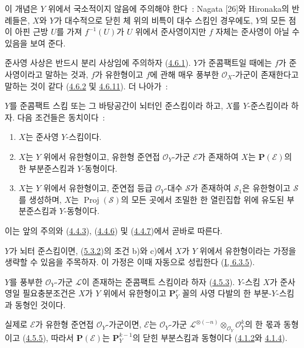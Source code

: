 이 개념은 $Y$ 위에서 국소적이지 않음에 주의해야 한다~: Nagata [26]와
Hironaka의 반례들은, $X$와 $Y$가 대수적으로 닫힌 체 위의 비특이 대수
스킴인 경우에도, $Y$의 모든 점이 아핀 근방 $U$를 가져
$f^{-1}(U)$가 $U$ 위에서 준사영이지만 $f$ 자체는 준사영이 아닐 수
있음을 보여 준다.

준사영 사상은 반드시 분리 사상임에 주의하자
(\hyperref[II.4.6.1-ko]{4.6.1}). $Y$가 준콤팩트일 때에는 $f$가
준사영이라고 말하는 것과, $f$가 유한형이고 $f$에 관해 매우 풍부한
$\mathcal{O}_X$-가군이 존재한다고 말하는 것이 같다
(\hyperref[II.4.6.2-ko]{4.6.2} 및
\hyperref[II.4.6.11-ko]{4.6.11}). 더 나아가~:

\begin{proposition}[5.3.2]
\label{II.5.3.2-ko}
$Y$를 준콤팩트 스킴 또는 그 바탕공간이 뇌터인 준스킴이라 하고,
$X$를 $Y$-준스킴이라 하자. 다음 조건들은 동치이다~:
\begin{enumerate}
  \item[\rm{a)}] $X$는 준사영 $Y$-스킴이다.
  \item[\rm{b)}] $X$는 $Y$ 위에서 유한형이고, 유한형 준연접
  $\mathcal{O}_Y$-가군 $\mathcal{E}$가 존재하여 $X$는
  $\mathbf{P}(\mathcal{E})$의 한 부분준스킴과 $Y$-동형이다.
  \item[\rm{c)}] $X$는 $Y$ 위에서 유한형이고, 준연접 등급
  $\mathcal{O}_Y$-대수 $\mathcal{S}$가 존재하여 $\mathcal{S}_1$은
  유한형이고 $\mathcal{S}$를 생성하며, $X$는
  $\operatorname{Proj}(\mathcal{S})$의 모든 곳에서 조밀한 한 열린집합
  위에 유도된 부분준스킴과 $Y$-동형이다.
\end{enumerate}
\end{proposition}

이는 앞의 주의와 (\hyperref[II.4.4.3-ko]{4.4.3}),
(\hyperref[II.4.4.6-ko]{4.4.6}) 및
(\hyperref[II.4.4.7-ko]{4.4.7})에서 곧바로 따른다.

$Y$가 뇌터 준스킴이면, (\hyperref[II.5.3.2-ko]{5.3.2})의 조건 b)와
c)에서 $X$가 $Y$ 위에서 유한형이라는 가정을 생략할 수 있음을
주목하자. 이 가정은 이때 자동으로 성립한다
(\hyperref[I.6.3.5-ko]{I, 6.3.5}).

\begin{corollary}[5.3.3]
\label{II.5.3.3-ko}
$Y$를 풍부한 $\mathcal{O}_Y$-가군 $\mathcal{L}$이 존재하는 준콤팩트
스킴이라 하자 (\hyperref[II.4.5.3-ko]{4.5.3}). $Y$-스킴 $X$가
준사영일 필요충분조건은 $X$가 $Y$ 위에서 유한형이고
$\mathbf{P}_Y^r$ 꼴의 사영 다발의 한 부분-$Y$-스킴과 동형인 것이다.
\end{corollary}

실제로 $\mathcal{E}$가 유한형 준연접 $\mathcal{O}_Y$-가군이면,
$\mathcal{E}$는 $\mathcal{O}_Y$-가군
$\mathcal{L}^{\otimes(-n)}\otimes_{\mathcal{O}_Y}\mathcal{O}_Y^k$의
한 몫과 동형이고 (\hyperref[II.4.5.5-ko]{4.5.5}), 따라서
$\mathbf{P}(\mathcal{E})$는 $\mathbf{P}_Y^{k-1}$의 닫힌 부분스킴과
동형이다 (\hyperref[II.4.1.2-ko]{4.1.2}와
\hyperref[II.4.1.4-ko]{4.1.4}).

